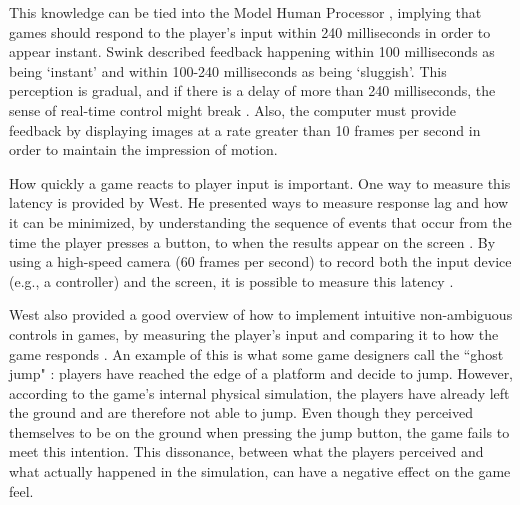 This knowledge can be tied into the Model Human Processor \cite{card1986model, swink}, implying that games should respond to the player's input within 240 milliseconds in order to appear instant. Swink described feedback happening within 100 milliseconds as being `instant' and within 100-240 milliseconds as being `sluggish'. This perception is gradual, and if there is a delay of more than 240 milliseconds, the sense of real-time control might break \cite{swink}. Also, the computer must provide feedback by displaying images at a rate greater than 10 frames per second in order to maintain the impression of motion.

How quickly a game reacts to player input is important. One way to measure this latency is provided by West. He presented ways to measure response lag and how it can be minimized, by understanding the sequence of events that occur from the time the player presses a button, to when the results appear on the screen \cite{measure_lag, program_lag}. By using a high-speed camera (60 frames per second) to record both the input device (e.g., a controller) and the screen, it is possible to measure this latency \cite{euro}.


West also provided a good overview of how to implement intuitive non-ambiguous controls in games, by measuring the player's input and comparing it to how the game responds \cite{intuitive_buttons}. An example of this is what some game designers call the ``ghost jump" \cite{ghostJump, canabalt}: players have reached the edge of a platform and decide to jump. However, according to the game's internal physical simulation, the players have already left the ground and are therefore not able to jump. Even though they perceived themselves to be on the ground when pressing the jump button, the game fails to meet this intention. This dissonance, between what the players perceived and what actually happened in the simulation, can have a negative effect on the game feel.

